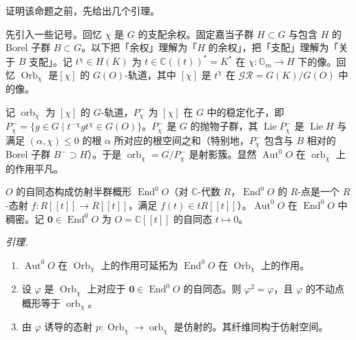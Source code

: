 证明该命题之前，先给出几个引理。

 先引入一些记号。回忆 $\chi$ 是 $G$ 的支配余权。固定嘉当子群 $H\subset G$ 与包含 $H$ 的 Borel 子群 $B\subset G$。以下把「余权」理解为「$H$ 的余权」，把「支配」理解为「关于 $B$ 支配」。记 $t^{\chi}\in H(K)$ 为 $t\in\mathbb{C}((t))^{*}=K^{*}$ 在 $\chi:\mathbb{G}_{m}\to H$ 下的像。回忆 $\operatorname{Orb}_{\chi}$ 是$[\chi]$ 的 $G(O)$-轨道，其中 $[\chi]$ 是 $t^{\chi}$ 在 $\mathcal{GR}=G(K)/G(O)$ 中的像。

记 $\operatorname{orb}_{\chi}$ 为 $[\chi]$ 的 $G$-轨道，$P^{-}_{\chi}$ 为 $[\chi]$ 在 $G$ 中的稳定化子，即 $P^{-}_{\chi}=\{g\in G\mid t^{-\chi}gt^{\chi}\in G(O)\}$。$P^{-}_{\chi}$ 是 $G$ 的抛物子群，其 $\operatorname{Lie}P^{-}_{\chi}$ 是 $\operatorname{Lie}H$ 与满足 $(\alpha,\chi)\le 0$ 的根 $\alpha$ 所对应的根空间之和（特别地，$P^{-}_{\chi}$ 包含与 $B$ 相对的 Borel 子群 $B^{-}\supset H$）。于是 $\operatorname{orb}_{\chi}=G/P^{-}_{\chi}$ 是射影簇。显然 $\operatorname{Aut}^{0}O$ 在 $\operatorname{orb}_{\chi}$ 上的作用平凡。

 $O$ 的自同态构成仿射半群概形 $\operatorname{End}^{0}O$（对 $\mathbb{C}$-代数 $R$，$\operatorname{End}^{0}O$ 的 $R$-点是一个 $R$-态射 $f:R[[t]]\to R[[t]]$，满足 $f(t)\in tR[[t]]$）。$\operatorname{Aut}^{0}O$ 在 $\operatorname{End}^{0}O$ 中稠密。记 $\mathbf{0}\in\operatorname{End}^{0}O$ 为 $O=\mathbb{C}[[t]]$ 的自同态 $t\mapsto 0$。

 \emph{引理.}
\begin{enumerate}[label=\roman*),leftmargin=2.2em]
\item $\operatorname{Aut}^{0}O$ 在 $\operatorname{Orb}_{\chi}$ 上的作用可延拓为 $\operatorname{End}^{0}O$ 在 $\operatorname{Orb}_{\chi}$ 上的作用。
\item 设 $\varphi$ 是 $\operatorname{Orb}_{\chi}$ 上对应于 $\mathbf{0}\in\operatorname{End}^{0}O$ 的自同态。则 $\varphi^{2}=\varphi$，且 $\varphi$ 的不动点概形等于 $\operatorname{orb}_{\chi}$。
\item 由 $\varphi$ 诱导的态射 $p:\operatorname{Orb}_{\chi}\to\operatorname{orb}_{\chi}$ 是仿射的。其纤维同构于仿射空间。
\end{enumerate}

